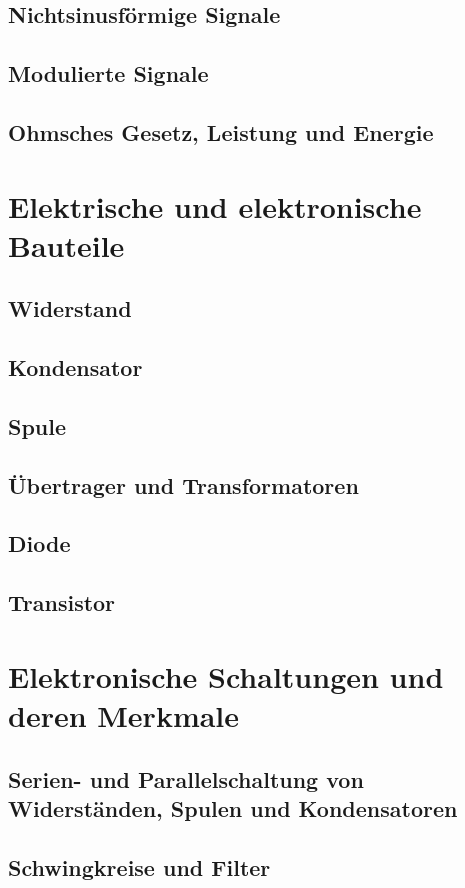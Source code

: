 \documentclass[
  ngerman,
  paper=a4,
  10pt,
  headings=small,
  DIV=15,
]{scrartcl}
\begin{document}
  \subsection{Nichtsinusförmige Signale}
  \subsection{Modulierte Signale}
  \subsection{Ohmsches Gesetz, Leistung und Energie}
  
  \section{Elektrische und elektronische Bauteile}
  \subsection{Widerstand}
  \subsection{Kondensator}
  \subsection{Spule}
  \subsection{Übertrager und Transformatoren}
  \subsection{Diode}
  \subsection{Transistor}
  
  \section{Elektronische Schaltungen und deren Merkmale}
  \subsection{Serien- und Parallelschaltung von Widerständen, Spulen und Kondensatoren}
  \subsection{Schwingkreise und Filter}
\end{document}
